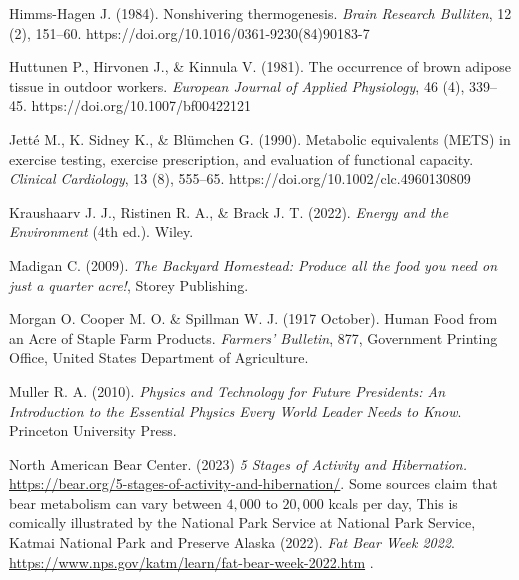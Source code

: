 \documentclass[jou]{apa7}
\begin{document}
\begin{thebibliography}{99}
Himms-Hagen J.
(1984).
Nonshivering thermogenesis. 
\textit{Brain Research Bulliten},
12 (2),
151--60.
https://doi.org/10.1016/0361-9230(84)90183-7

Huttunen P., Hirvonen J., \& Kinnula V.
(1981).
The occurrence of brown adipose tissue in outdoor workers.
\textit{European Journal of Applied Physiology}, 
46 (4), 339--45. 
https://doi.org/10.1007/bf00422121

Jetté M., K. Sidney K., \& Blümchen G.
(1990). 
Metabolic equivalents (METS) in exercise testing, exercise prescription, and evaluation of functional capacity.
\textit{Clinical Cardiology}, 
13 (8), 555--65.
https://doi.org/10.1002/clc.4960130809

Kraushaarv J. J., Ristinen R. A., \& Brack J. T.
(2022).
\textit{Energy and the Environment} (4th ed.).
Wiley.

Madigan C. 
(2009).
\textit{The Backyard Homestead: Produce all the food you need on just a quarter acre!},
Storey Publishing.

Morgan O. Cooper  M. O. \& Spillman W. J. 
(1917 October).
Human Food from an Acre of Staple Farm Products.
\textit{Farmers' Bulletin}, 
877,
Government Printing Office, United States Department of Agriculture.

Muller R. A. 
(2010).
\textit{Physics and Technology for Future Presidents: An Introduction to the Essential Physics Every World Leader Needs to Know}.
Princeton University Press.

North American Bear Center.
(2023)
\textit{5 Stages of Activity and Hibernation.}
\url{https://bear.org/5-stages-of-activity-and-hibernation/}.
%
Some sources claim that bear metabolism can vary between $4,000$ to $20,000$ kcals per day, 
This is comically illustrated by the National Park Service at 
National Park Service, Katmai National Park and Preserve Alaska 
(2022).
\textit{Fat Bear Week 2022}.
\url{https://www.nps.gov/katm/learn/fat-bear-week-2022.htm} .


\end{thebibliography}
\end{document}
